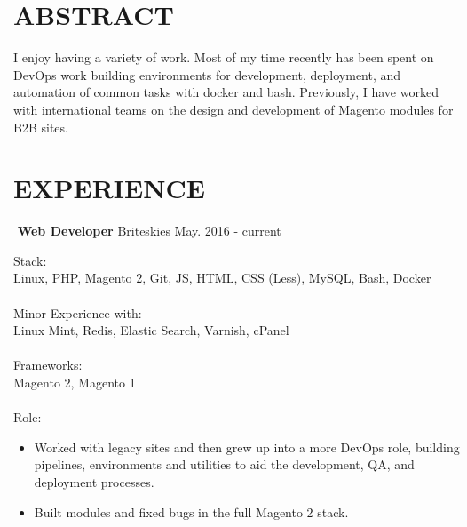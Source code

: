 \documentclass{res}
\begin{document}
\begin{resume}


\section{ABSTRACT}          
    I enjoy having a variety of work. Most of my time recently has been spent on DevOps work	building environments for development, deployment, and automation of common tasks with docker and bash. Previously, I have worked with international teams on the design and development of Magento modules for B2B sites.
 
 
\section{EXPERIENCE}
   \vspace{-0.1in}
   
   \begin{tabbing}
   		\hspace{2.0in}\= \hspace{2.7in}\= \kill %
    	\textbf{Web Developer} \>Briteskies     \>May. 2016 - current\\
   \end{tabbing}\vspace{-20pt}      %
   
    Stack: \\
	Linux, PHP, Magento 2, Git, JS, HTML, CSS (Less), MySQL, Bash, Docker \\
	\\
	Minor Experience with: \\
	Linux Mint, Redis, Elastic Search, Varnish, cPanel \\
	\\
	Frameworks: \\
	Magento 2, Magento 1 \\
	\\
	Role: \\
	\vspace{-0.15in}	
	\begin{itemize}
		\item Worked with legacy sites and then grew up into a more DevOps role, building pipelines, environments and utilities to aid the development, QA, and deployment processes.
		\item Built modules and fixed bugs in the full Magento 2 stack.
	\end{itemize}
    

\end{resume}
\end{document}
